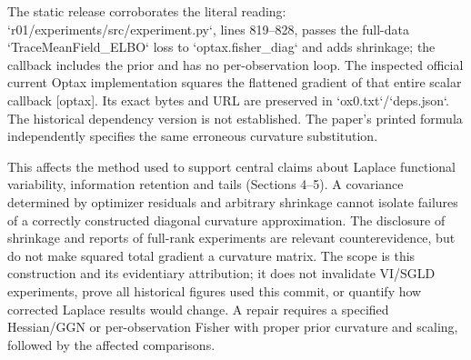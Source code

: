 \documentclass[10pt]{article}
\begin{document}
The static release corroborates the literal reading: `r01/experiments/src/experiment.py`, lines 819–828, passes the full-data `TraceMeanField\_ELBO` loss to `optax.fisher\_diag` and adds shrinkage; the callback includes the prior and has no per-observation loop. The inspected official current Optax implementation squares the flattened gradient of that entire scalar callback [optax]. Its exact bytes and URL are preserved in `ox0.txt`/`deps.json`. The historical dependency version is not established. The paper’s printed formula independently specifies the same erroneous curvature substitution.\par
This affects the method used to support central claims about Laplace functional variability, information retention and tails (Sections 4–5). A covariance determined by optimizer residuals and arbitrary shrinkage cannot isolate failures of a correctly constructed diagonal curvature approximation. The disclosure of shrinkage and reports of full-rank experiments are relevant counterevidence, but do not make squared total gradient a curvature matrix. The scope is this construction and its evidentiary attribution; it does not invalidate VI/SGLD experiments, prove all historical figures used this commit, or quantify how corrected Laplace results would change. A repair requires a specified Hessian/GGN or per-observation Fisher with proper prior curvature and scaling, followed by the affected comparisons.\par
\end{document}
